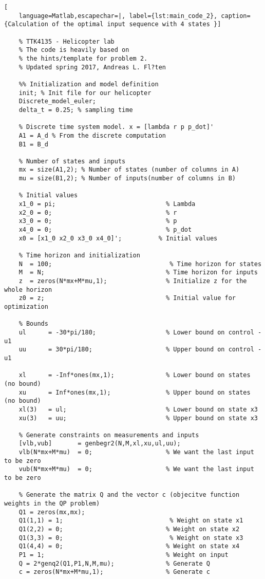 \begin{lstlisting}[
    language=Matlab,escapechar=|, label={lst:main_code_2}, caption={Calculation of the optimal input sequence with 4 states }] 
    
    % TTK4135 - Helicopter lab
    % The code is heavily based on 
    % the hints/template for problem 2.
    % Updated spring 2017, Andreas L. Fl?ten
    
    %% Initialization and model definition
    init; % Init file for our helicopter
    Discrete_model_euler;
    delta_t	= 0.25; % sampling time
    
    % Discrete time system model. x = [lambda r p p_dot]'
    A1 = A_d % From the discrete computation
    B1 = B_d 
    
    % Number of states and inputs
    mx = size(A1,2); % Number of states (number of columns in A)
    mu = size(B1,2); % Number of inputs(number of columns in B)
    
    % Initial values
    x1_0 = pi;                              % Lambda
    x2_0 = 0;                               % r
    x3_0 = 0;                               % p
    x4_0 = 0;                               % p_dot
    x0 = [x1_0 x2_0 x3_0 x4_0]';          % Initial values
    
    % Time horizon and initialization
    N  = 100;                                % Time horizon for states
    M  = N;                                 % Time horizon for inputs
    z  = zeros(N*mx+M*mu,1);                % Initialize z for the whole horizon
    z0 = z;                                 % Initial value for optimization
    
    % Bounds
    ul 	    = -30*pi/180;                   % Lower bound on control - u1
    uu 	    = 30*pi/180;                    % Upper bound on control - u1
    
    xl      = -Inf*ones(mx,1);              % Lower bound on states (no bound)
    xu      = Inf*ones(mx,1);               % Upper bound on states (no bound)
    xl(3)   = ul;                           % Lower bound on state x3
    xu(3)   = uu;                           % Upper bound on state x3
    
    % Generate constraints on measurements and inputs
    [vlb,vub]       = genbegr2(N,M,xl,xu,ul,uu); 
    vlb(N*mx+M*mu)  = 0;                    % We want the last input to be zero
    vub(N*mx+M*mu)  = 0;                    % We want the last input to be zero
    
    % Generate the matrix Q and the vector c (objecitve function weights in the QP problem) 
    Q1 = zeros(mx,mx);
    Q1(1,1) = 1;                             % Weight on state x1
    Q1(2,2) = 0;                            % Weight on state x2
    Q1(3,3) = 0;                             % Weight on state x3 
    Q1(4,4) = 0;                            % Weight on state x4 
    P1 = 1;                                 % Weight on input
    Q = 2*genq2(Q1,P1,N,M,mu);              % Generate Q
    c = zeros(N*mx+M*mu,1);                 % Generate c
    

\end{lstlisting}
